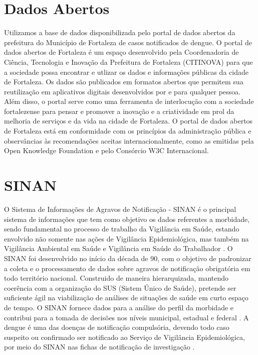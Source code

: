 \documentclass[
	12pt,				%
	openright,			%
	oneside,	
	a4paper,				%
	english,				%
	brazil				%
]{abntex2/abntex2} %
\begin{document}
	\section{Dados Abertos}

	Utilizamos a base de dados disponibilizada pelo portal de dados abertos da prefeitura do Município de Fortaleza de casos notificados de dengue. O portal de dados abertos de Fortaleza é um espaço desenvolvido pela Coordenadoria de Ciência, Tecnologia e Inovação da Prefeitura de Fortaleza (CITINOVA) para que a sociedade possa encontrar e utlizar os dados e informações públicas da cidade de Fortaleza. Os dados são publicados em formatos abertos que permitem sua reutilização em aplicativos digitais desenvolvidos por e para qualquer pessoa. Além disso, o portal serve como uma ferramenta de interlocução com a sociedade fortalezense para pensar e promover  a inovação e a criatividade em prol da melhoria de serviços e da vida na cidade de Fortaleza. O portal de dados abertos de Fortaleza está em conformidade com os princípios da administração pública e observâncias às recomendações aceitas internacionalmente, como as emitidas pela Open Knowledge Foundation e pelo Consórcio W3C Internacional.
		
		
	\section{SINAN}
	
	O Sistema de Informações de Agravos de Notificação - SINAN é o principal sistema de informações que tem como objetivo os dados referentes a morbidade, sendo fundamental no processo de trabalho da Vigilância em Saúde, estando envolvido não somente nas ações de Vigilância Epidemiológica, mas também na Vigilância Ambiental em Saúde e Vigilância em Saúde do Trabalhador \cite{conass:2015}.
	O SINAN foi desenvolvido no início da década de 90, com o objetivo de padronizar a coleta e o processamento de dados sobre agravos de notificação obrigatória em todo território nacional. Construido de maneira hierarquizada, mantendo coerência com a organização do SUS (Sistem Único de Saúde), pretende ser suficiente ágil na viabilização de análises de situações de saúde em curto espaço de tempo. O SINAN fornece dados para a análise do perfil da morbidade e contribui para a tomada de decisões nos níveis municipal, estadual e federal \cite{saude:2008}.
	A dengue é uma das doenças de notificação compulsória, devendo todo caso suspeito ou confirmado ser notificado ao Serviço de Vigilância Epidemiológica, por meio do SINAN nas fichas de notificação de investigação \cite{saude:2008}.
	
\end{document}
